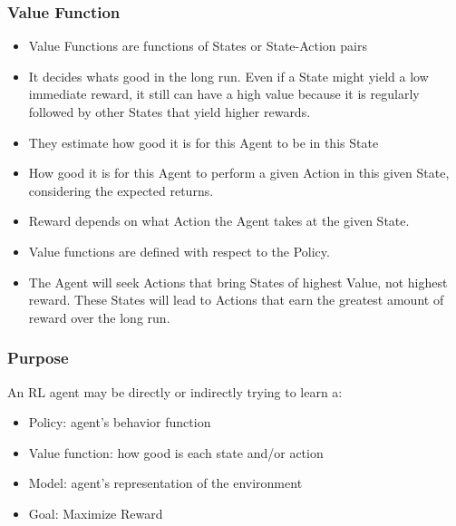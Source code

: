 \begin{frame}[fragile]\frametitle{Value Function}

\begin{itemize}
\item Value Functions are functions of States or State-Action pairs
\item It decides whats good in the long run. Even if a State might yield a low immediate reward, it still can have a high value because it is regularly followed by other States that yield higher rewards.
\item They estimate how good it is for this Agent to be in this State
\item How good it is for this Agent to perform a given Action in this given State, considering the expected returns.
\item Reward depends on what Action the Agent takes at the given State.
\item Value functions are defined with respect to the Policy.
\item The Agent will seek Actions that bring States of highest Value, not highest reward. These States will lead to Actions that earn the greatest amount of reward over the long run.
\end{itemize}

\end{frame}

\begin{frame}[fragile]\frametitle{Purpose}

An RL agent may be directly or indirectly trying to learn a:

\begin{itemize}
\item Policy: agent’s behavior function
\item Value function: how good is each state and/or action
\item Model: agent’s representation of the environment
\item Goal: Maximize Reward
\end{itemize}
\end{frame}


